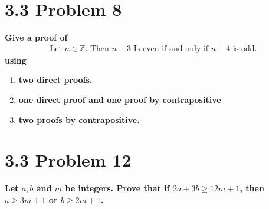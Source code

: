 \documentclass[10pt]{article}
\begin{document}
\section{3.3 Problem 8}
\textbf{Give a proof of
    \begin{align*}
        \text{Let } n \in \mathbb{Z} \text{.  Then } n - 3 \text{ Is even if and only if } n + 4 \text{ is odd.}
    \end{align*}
using}

\begin{enumerate}[label=(\alph*)]

    \item \textbf{two direct proofs.}
    \item \textbf{one direct proof and one proof by contrapositive}
    \item \textbf{two proofs by contrapositive.}
    

\end{enumerate}





\section{3.3 Problem 12}
\textbf{Let $a,b$ and $m$ be integers.  Prove that if $2a + 3b \geq 12m +1$, then $a \geq 3m + 1$ or $b \geq 2m + 1$.}
\end{document}
